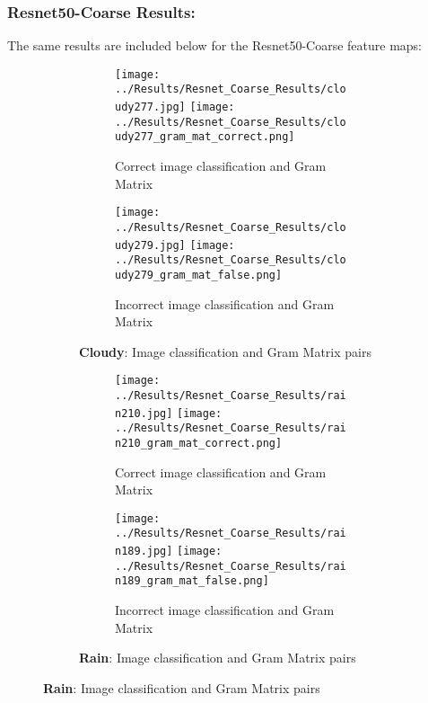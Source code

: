 \documentclass{article}
\begin{document}
\subsubsection{Resnet50-Coarse Results:}
The same results are included below for the Resnet50-Coarse feature maps:
\begin{figure}[H]
    \centering
    \begin{subfigure}{\linewidth}
        \centering
        \begin{subfigure}{0.49\linewidth}
            \centering
            \texttt{[image: ../Results/Resnet\_Coarse\_Results/cloudy277.jpg]}
            \texttt{[image: ../Results/Resnet\_Coarse\_Results/cloudy277\_gram\_mat\_correct.png]}
            \caption*{Correct image classification and Gram Matrix}
        \end{subfigure}
        \begin{subfigure}{0.49\linewidth}
            \centering
            \texttt{[image: ../Results/Resnet\_Coarse\_Results/cloudy279.jpg]}
            \texttt{[image: ../Results/Resnet\_Coarse\_Results/cloudy279\_gram\_mat\_false.png]}
            \caption*{Incorrect image classification and Gram Matrix}
        \end{subfigure}
        \caption*{\textbf{Cloudy}: Image classification and Gram Matrix pairs}
    \end{subfigure}
    \hfill

    \begin{subfigure}{\linewidth}
        \centering
        \begin{subfigure}{0.49\linewidth}
            \centering
            \texttt{[image: ../Results/Resnet\_Coarse\_Results/rain210.jpg]}
            \texttt{[image: ../Results/Resnet\_Coarse\_Results/rain210\_gram\_mat\_correct.png]}
            \caption*{Correct image classification and Gram Matrix}
        \end{subfigure}
        \begin{subfigure}{0.49\linewidth}
            \centering
            \texttt{[image: ../Results/Resnet\_Coarse\_Results/rain189.jpg]}
            \texttt{[image: ../Results/Resnet\_Coarse\_Results/rain189\_gram\_mat\_false.png]}
            \caption*{Incorrect image classification and Gram Matrix}
        \end{subfigure}
        \caption*{\textbf{Rain}: Image classification and Gram Matrix pairs}
    \end{subfigure}
    \hfill


\end{figure}
\end{document}
